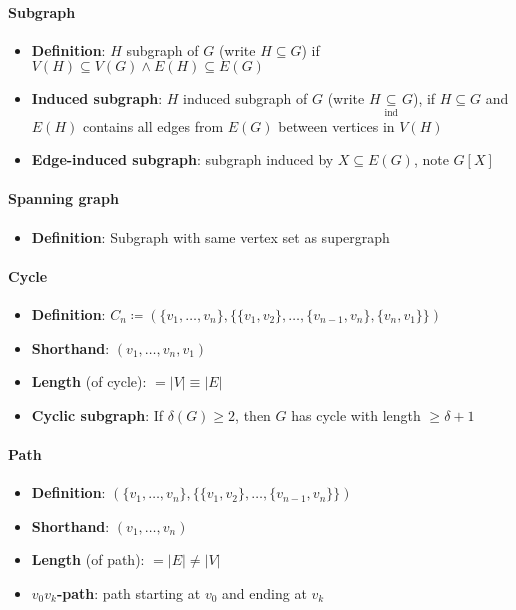 \paragraph{Subgraph}
\begin{itemize}
  \item \textbf{Definition}: $ H $ subgraph of $ G $ (write $ H \subseteq G $) if $ V(H) \subseteq V(G) \wedge E(H) \subseteq E(G) $
  \item \textbf{Induced subgraph}: $ H $ induced subgraph of $ G $ (write $ H \underset{\text{ind}}{\subseteq} G $), if $ H \subseteq G $ and $ E(H) $ contains all edges from $ E(G) $ between vertices in $ V(H) $
  \item \textbf{Edge-induced subgraph}: subgraph induced by $ X \subseteq E(G) $, note $ G[X] $
\end{itemize}

\paragraph{Spanning graph}
\begin{itemize}
  \item \textbf{Definition}: Subgraph with same vertex set as supergraph 
\end{itemize}

\paragraph{Cycle}
\begin{itemize}
  \item \textbf{Definition}: $ C_n \coloneqq (\{ v_1, \dots, v_n \}, \{ \{ v_1, v_2 \},\dots,\{ v_{n-1},v_n \},\{ v_n, v_1 \} \}) $
  \item \textbf{Shorthand}: $ (v_1, \dots, v_n, v_1) $
  \item \textbf{Length} (of cycle): $ = \vert V \vert \equiv \vert E \vert $
  \item \textbf{Cyclic subgraph}: If $ \delta(G) \geq 2 $, then $ G $ has cycle with length $ \geq \delta + 1 $
\end{itemize}

\paragraph{Path}
\begin{itemize}
  \item \textbf{Definition}: $ (\{ v_1, \dots, v_n \}, \{ \{ v_1, v_2 \}, \dots, \{ v_{n-1},v_n \} \}) $
  \item \textbf{Shorthand}: $ (v_1, \dots, v_n) $
  \item \textbf{Length} (of path): $ = \vert E \vert \neq \vert V \vert $
  \item \textbf{$ v_0v_k $-path}: path starting at $ v_0 $ and ending at $ v_k $
\end{itemize}

